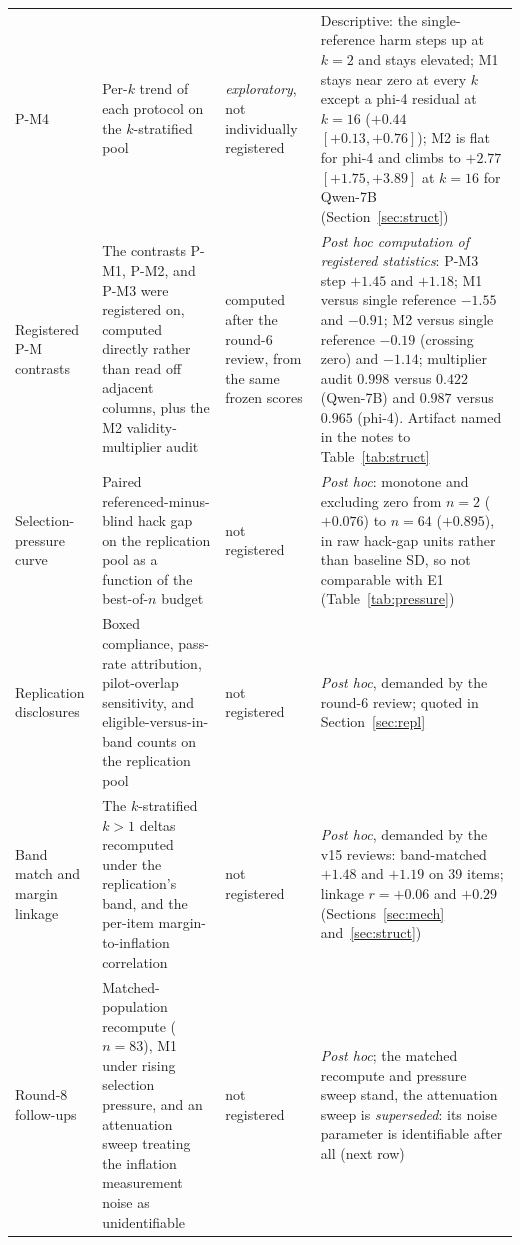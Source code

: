 \documentclass[11pt]{article}
\begin{document}
\begin{longtable}{L{1.7cm}L{5.3cm}L{2.5cm}L{5.1cm}}
\addlinespace[1pt]
P-M4 & Per-$k$ trend of each protocol on the $k$-stratified pool & \emph{exploratory}, not individually registered & Descriptive: the single-reference harm steps up at $k{=}2$ and stays elevated; M1 stays near zero at every $k$ except a phi-4 residual at $k{=}16$ ($+0.44$ $[+0.13, +0.76]$); M2 is flat for phi-4 and climbs to $+2.77$ $[+1.75, +3.89]$ at $k{=}16$ for Qwen-7B (Section~\ref{sec:struct}) \\
\addlinespace[1pt]
Registered P-M contrasts & The contrasts P-M1, P-M2, and P-M3 were registered on, computed directly rather than read off adjacent columns, plus the M2 validity-multiplier audit & computed after the round-6 review, from the same frozen scores & \emph{Post hoc computation of registered statistics}: P-M3 step $+1.45$ and $+1.18$; M1 versus single reference $-1.55$ and $-0.91$; M2 versus single reference $-0.19$ (crossing zero) and $-1.14$; multiplier audit $0.998$ versus $0.422$ (Qwen-7B) and $0.987$ versus $0.965$ (phi-4). Artifact named in the notes to Table~\ref{tab:struct} \\
\addlinespace[1pt]
Selection-pressure curve & Paired referenced-minus-blind hack gap on the replication pool as a function of the best-of-$n$ budget & not registered & \emph{Post hoc}: monotone and excluding zero from $n{=}2$ ($+0.076$) to $n{=}64$ ($+0.895$), in raw hack-gap units rather than baseline SD, so not comparable with E1 (Table~\ref{tab:pressure}) \\
\addlinespace[1pt]
Replication disclosures & Boxed compliance, pass-rate attribution, pilot-overlap sensitivity, and eligible-versus-in-band counts on the replication pool & not registered & \emph{Post hoc}, demanded by the round-6 review; quoted in Section~\ref{sec:repl} \\
\addlinespace[1pt]
Band match and margin linkage & The $k$-stratified $k{>}1$ deltas recomputed under the replication's band, and the per-item margin-to-inflation correlation & not registered & \emph{Post hoc}, demanded by the v15 reviews: band-matched $+1.48$ and $+1.19$ on 39 items; linkage $r = +0.06$ and $+0.29$ (Sections~\ref{sec:mech} and~\ref{sec:struct}) \\
\addlinespace[1pt]
Round-8 follow-ups & Matched-population recompute ($n{=}83$), M1 under rising selection pressure, and an attenuation sweep treating the inflation measurement noise as unidentifiable & not registered & \emph{Post hoc}; the matched recompute and pressure sweep stand, the attenuation sweep is \emph{superseded}: its noise parameter is identifiable after all (next row) \\

\end{longtable}
\end{document}
